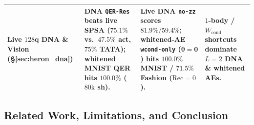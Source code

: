 \documentclass[11pt]{article}
\begin{document}
\begin{table}[t!]
{\begin{tabular}{@{}llll@{}}
Live $128$q DNA \& Vision (\S\ref{sec:heron_dna}) & DNA \texttt{QER-Res} beats live SPSA ($75.1\%$ vs.\ $47.5\%$ act, $75\%$ TATA); whitened MNIST QER hits $100.0\%$ ($80\text{k}$ sh). & Live DNA \texttt{no-zz} scores $81.9\% / 59.4\%$; whitened-AE \texttt{wcond-only} ($\boldsymbol{\theta}{=}\mathbf{0}$) hits $100.0\%$ MNIST / $71.5\%$ Fashion ($\text{Rec}{=}0$). & $1$-body / $W_{\text{cond}}$ shortcuts dominate $L{=}2$ DNA \& whitened AEs. \\
\bottomrule
\end{tabular}%
}
\end{table}

\subsection{Related Work, Limitations, and Conclusion}
\label{sec:conclusion}
\end{document}
